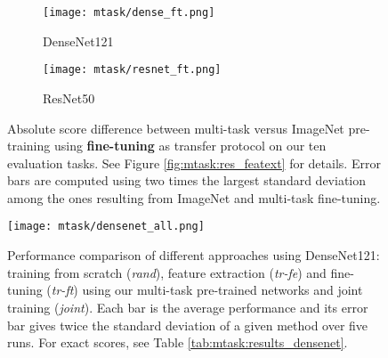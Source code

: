 \begin{figure}[t]
    \centering
    \begin{subfigure}[t]{0.70\textwidth}
        \centering
        \texttt{[image: mtask/dense\_ft.png]}
        \caption{DenseNet121}
    \end{subfigure}    
    \begin{subfigure}[t]{0.70\textwidth}
        \centering
        \texttt{[image: mtask/resnet\_ft.png]}\\
        \caption{ResNet50}
    \end{subfigure}    
    \caption{Absolute score difference between multi-task versus ImageNet pre-training using \textbf{fine-tuning} as transfer protocol on our ten evaluation tasks. See Figure \ref{fig:mtask:res_featext} for details. Error bars are computed using two times the largest standard deviation among the ones resulting from ImageNet and multi-task fine-tuning.}  
    \label{fig:mtask:res_finetune}
\end{figure}

\begin{figure}[t]
    \centering
    \texttt{[image: mtask/densenet\_all.png]}
    \caption{Performance comparison of different approaches using DenseNet121: training from scratch (\textit{rand}), feature extraction (\textit{tr-fe}) and fine-tuning (\textit{tr-ft}) using our multi-task pre-trained networks and joint training (\textit{joint}). Each bar is the average performance and its error bar gives twice the standard deviation of a given method over five runs. For exact scores, see Table \ref{tab:mtask:results_densenet}.}  
    \label{fig:mtask:res_all_densenet}
\end{figure}

